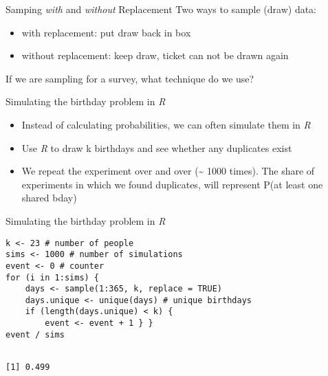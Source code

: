 \documentclass[presentation]{beamer}
\begin{document}
\begin{frame}[label={sec:org33373e5}]{Samping \emph{with} and \emph{without} Replacement}
Two ways to sample (draw) data:

\begin{itemize}
\item with replacement: put draw back in box

\item without replacement: keep draw, ticket can \alert{not} be drawn again
\end{itemize}

\pause
If we are sampling for a survey, what technique do we use?
\end{frame}


\begin{frame}[label={sec:orgf6ffbaf}]{Simulating the birthday problem in \emph{R}}
\begin{itemize}
\item Instead of calculating probabilities, we can often simulate them in \emph{R}

\item Use \emph{R} to draw k birthdays and see whether any duplicates exist
\end{itemize}

\pause

\begin{itemize}
\item We repeat the experiment over and over (\textasciitilde{} 1000 times). The share of experiments in which we found duplicates, will represent P(at least one shared bday)
\end{itemize}
\end{frame}

\begin{frame}[fragile,label={sec:org46d5766}]{Simulating the birthday problem in \emph{R}}
 \begin{verbatim}
k <- 23 # number of people
sims <- 1000 # number of simulations
event <- 0 # counter
for (i in 1:sims) {
    days <- sample(1:365, k, replace = TRUE)
    days.unique <- unique(days) # unique birthdays
    if (length(days.unique) < k) {
        event <- event + 1 } }
event / sims
\end{verbatim}

\begin{verbatim}

[1] 0.499
\end{verbatim}
\end{frame}
\end{document}
